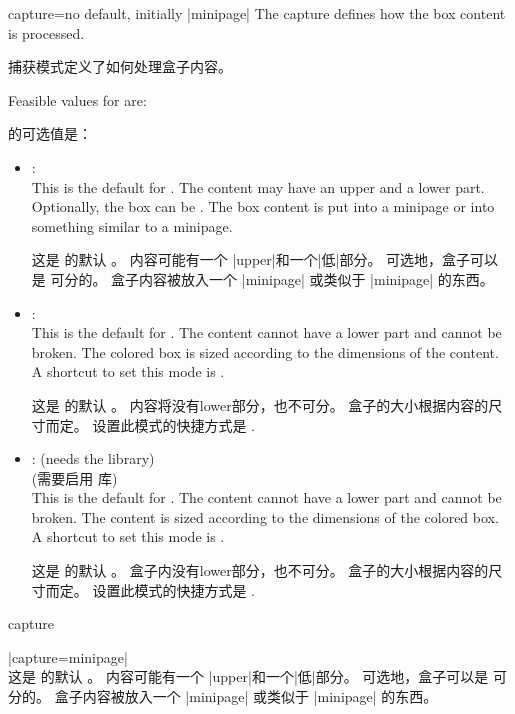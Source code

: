 \begin{docTcbKey}{capture}{=}{no default, initially |minipage|}
The capture  defines how the box content is processed.

捕获模式定义了如何处理盒子内容。

Feasible values for  are:

 的可选值是：
\begin{itemize}
\item{}:\\
  This is the default  for .
  The content may have an upper and a lower part. 
  Optionally, the box
  can be . The box content is put into a
  minipage or into something similar to a minipage.

这是  的默认  。%
内容可能有一个 |upper|和一个|低|部分。%
可选地，盒子可以是  可分的。
盒子内容被放入一个 |minipage| 或类似于 |minipage| 的东西。
\item{}:\\
  This is the default  for . The content cannot have
  a lower part and cannot be broken. The colored box is sized according
  to the dimensions of the content.
  A shortcut to set this mode is .

这是  的默认  。%
内容将没有lower部分，也不可分。%
盒子的大小根据内容的尺寸而定。%
设置此模式的快捷方式是 .
\item{}:%
 (needs the  library)\\

 (需要启用  库)\\
 
 This is the default  for . The content cannot have
  a lower part and cannot be broken.
  The content is sized according to the dimensions of the colored box.
  A shortcut to set this mode is .

这是  的默认 。 %
盒子内没有lower部分，也不可分。
盒子的大小根据内容的尺寸而定。%
设置此模式的快捷方式是 .
\end{itemize}

\begin{exdispExample}{capture}

\begin{tcolorbox}[capture=minipage]
|capture=minipage|\\
这是  的默认  。%
内容可能有一个 |upper|和一个|低|部分。%
\tcblower
可选地，盒子可以是  可分的。
盒子内容被放入一个 |minipage| 或类似于 |minipage| 的东西。
\end{tcolorbox}


\end{exdispExample}
\end{docTcbKey}
